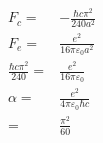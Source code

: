 \documentclass[10pt,fleqn]{article}
\newcommand{\eqar}[1]
{
  \begin{align*}
    #1
  \end{align*}
}
\begin{document}
\section{}
\subsection{}
\subsection{}
\subsection{}

\section{}
\eqar{
  F_c=&-\frac{\hbar c\pi^2}{240a^2}\\
  F_e=&\frac{e^2}{16\pi\varepsilon_0 a^2}\\
  \frac{\hbar c\pi^2}{240}=&\frac{e^2}{16\pi\varepsilon_0}\\
  \alpha=&\frac{e^2}{4\pi\varepsilon_0\hbar c}\\
  =&\frac{\pi^2}{60}
}

\section{}
\end{document}
